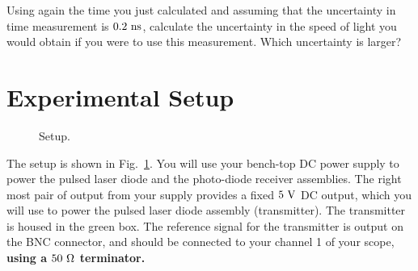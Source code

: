 \begin{calculation} Using again the time you just calculated and assuming that the
uncertainty in time measurement is $0.2~\rm ns$, calculate the
uncertainty in the speed of light you would obtain if you were to use
this measurement. Which uncertainty is larger? 
\end{calculation}

\section{Experimental Setup}

\begin{figure}[htbp]
\begin{center}
\end{center}
\caption{\label{fig:csetup} Setup.}
\end{figure}

The setup is shown in Fig.~\ref{fig:csetup}.  You will use your
bench-top DC power supply to power the pulsed laser diode and the
photo-diode receiver assemblies.  The right most pair of output from
your supply provides a fixed $5~\rm V$ DC output, which you will use
to power the pulsed laser diode assembly (transmitter).  The
transmitter is housed in the green box. The reference signal for the
transmitter is output on the BNC connector, and should be connected to
your channel 1 of your scope, {\bf using a $50~\rm \Omega$ terminator.}

